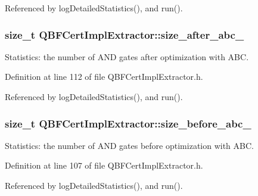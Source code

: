 Referenced by log\-Detailed\-Statistics(), and run().

\hypertarget{classQBFCertImplExtractor_a18a1c9ab317cada48d54b7006124190e}{
\subsubsection[{size\-\_\-after\-\_\-abc\-\_\-}]{\setlength{\rightskip}{0pt plus 5cm}size\-\_\-t Q\-B\-F\-Cert\-Impl\-Extractor\-::size\-\_\-after\-\_\-abc\-\_\-\hspace{0.3cm}{\ttfamily [protected]}}}\label{classQBFCertImplExtractor_a18a1c9ab317cada48d54b7006124190e}


Statistics\-: the number of A\-N\-D gates after optimization with A\-B\-C. 



Definition at line 112 of file Q\-B\-F\-Cert\-Impl\-Extractor.\-h.



Referenced by log\-Detailed\-Statistics(), and run().

\hypertarget{classQBFCertImplExtractor_a51eb6677e876d90d1b3763ca3e5457e7}{
\subsubsection[{size\-\_\-before\-\_\-abc\-\_\-}]{\setlength{\rightskip}{0pt plus 5cm}size\-\_\-t Q\-B\-F\-Cert\-Impl\-Extractor\-::size\-\_\-before\-\_\-abc\-\_\-\hspace{0.3cm}{\ttfamily [protected]}}}\label{classQBFCertImplExtractor_a51eb6677e876d90d1b3763ca3e5457e7}


Statistics\-: the number of A\-N\-D gates before optimization with A\-B\-C. 



Definition at line 107 of file Q\-B\-F\-Cert\-Impl\-Extractor.\-h.



Referenced by log\-Detailed\-Statistics(), and run().

